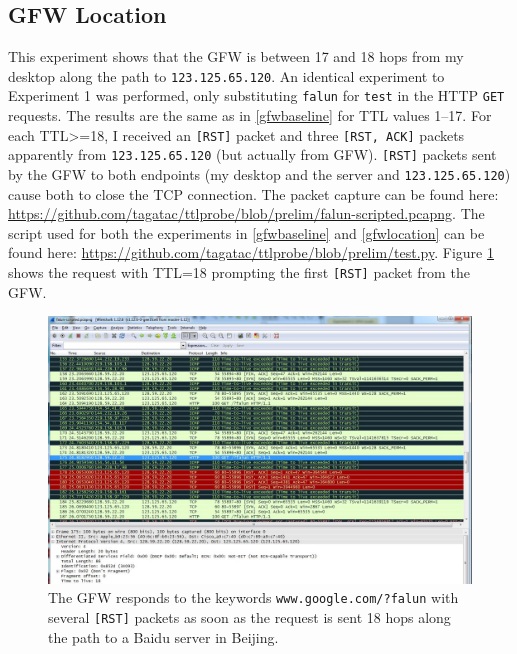 \subsection{GFW Location}\label{gfwlocation}
This experiment shows that the GFW is between 17 and 18 hops from my desktop along the path to \texttt{123.125.65.120}.
An identical experiment to Experiment 1 was performed, only substituting \texttt{falun} for \texttt{test} in the HTTP \texttt{GET} requests.
The results are the same as in \autoref{gfwbaseline} for TTL values 1--17.
For each TTL\textgreater=18, I received an \texttt{[RST]} packet and three \texttt{[RST, ACK]} packets apparently from \texttt{123.125.65.120} (but actually from GFW).
\texttt{[RST]} packets sent by the GFW to both endpoints (my desktop and the server and \texttt{123.125.65.120}) cause both to close the TCP connection.
The packet capture can be found here: \url{https://github.com/tagatac/ttlprobe/blob/prelim/falun-scripted.pcapng}.
The script used for both the experiments in \autoref{gfwbaseline} and \autoref{gfwlocation} can be found here: \url{https://github.com/tagatac/ttlprobe/blob/prelim/test.py}.
Figure \ref{fig_gfwfalun} shows the request with TTL=18 prompting the first \texttt{[RST]} packet from the GFW.
\begin{figure}
	\includegraphics[width=\textwidth]{figures/gfwfalun}
	\caption{The GFW responds to the keywords \texttt{www.google.com/?falun} with several \texttt{[RST]} packets as soon as the request is sent 18 hops along the path to a Baidu server in Beijing.}
	\label{fig_gfwfalun}
\end{figure}
